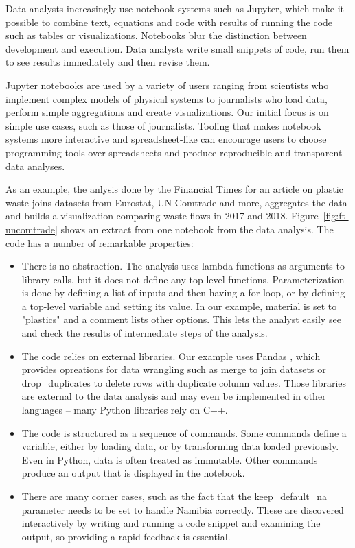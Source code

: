 \documentclass[acmsmall,anonymous,fleqn]{acmart}\settopmatter{printfolios=false,printccs=false,printacmref=false}
\theoremstyle{plain}
\theoremstyle{definition}
\newcommand{\str}[1]{\textnormal{\textcolor{strclr}{\sffamily "#1"}}}
\newcommand{\ident}[1]{\textnormal{\textcolor{idclr}{\sffamily #1}}}
\begin{document}
Data analysts increasingly use notebook systems such as Jupyter, which
make it possible to combine text, equations and code with results of running the code such as tables
or visualizations. Notebooks blur the distinction between development and execution.
Data analysts write small snippets of code, run them to see results immediately and then revise
them.

Jupyter notebooks are used by a variety of users ranging from scientists who implement complex
models of physical systems to journalists who load data, perform simple aggregations and create visualizations. Our
initial focus is on simple use cases, such as those of journalists. Tooling that makes notebook
systems more interactive and spreadsheet-like can encourage users to choose programming tools
over spreadsheets and produce reproducible and transparent data analyses.

As an example, the anlysis done by the Financial Times for an article on plastic waste
\cite{ftnotebooks,ftarticle} joins datasets from Eurostat, UN Comtrade and more, aggregates the data and
builds a visualization comparing waste flows in 2017 and 2018. Figure~\ref{fig:ft-uncomtrade} shows
an extract from one notebook from the data analysis. The code has a number of remarkable properties:
%
\begin{itemize}[itemsep=3pt]
\item There is no abstraction. The analysis uses lambda functions as arguments to library calls,
  but it does not define any top-level functions. Parameterization is done by defining a list of
  inputs and then having a for loop, or by defining a top-level variable and setting its value.
  In our example, \ident{material} is set to \str{plastics} and a comment lists other options.
  This lets the analyst easily see and check the results of intermediate steps of the analysis.

\item The code relies on external libraries. Our example uses Pandas \cite{pandas},
  which provides opreations for data wrangling such as \ident{merge} to join datasets
  or \ident{drop\_duplicates} to delete rows with duplicate column values. Those libraries are
  external to the data analysis and may even be implemented in other languages -- many Python
  libraries rely on C++.

\item The code is structured as a sequence of commands. Some commands define a variable, either by
  loading data, or by transforming data loaded previously. Even in Python, data is often treated
  as immutable. Other commands produce an output that is displayed in the notebook.

\item There are many corner cases, such as the fact that the \ident{keep\_default\_na} parameter
  needs to be set to handle Namibia correctly. These are discovered interactively by writing and
  running a code snippet and examining the output, so providing a rapid feedback is essential.
\end{itemize}
\end{document}
